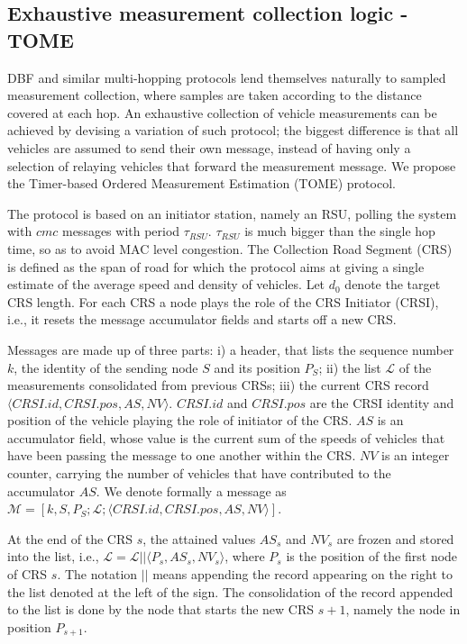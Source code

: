 \documentclass[conference]{IEEEtran}
\begin{document}
\subsection{Exhaustive measurement collection logic - TOME}
\label{subsec:DBFexh}
DBF and similar multi-hopping protocols lend themselves naturally to sampled measurement collection, where samples are taken according to the distance covered at each hop. An exhaustive collection of vehicle measurements can be achieved by devising a variation of such protocol; the biggest difference is that all vehicles are assumed to send their own message, instead of having only a selection of relaying vehicles that forward the measurement message. We propose the Timer-based Ordered Measurement Estimation (TOME) protocol.


The protocol is based on an initiator station, namely an RSU, polling the system with $cmc$ messages with period $\tau_{RSU}$. $\tau_{RSU}$ is much bigger than the single hop time, so as to avoid MAC level congestion. The Collection Road Segment (CRS) is defined as the span of road for which the protocol aims at giving a single estimate of the average speed and density of vehicles. Let $d_0$ denote the target CRS length. For each CRS a node plays the role of the CRS Initiator (CRSI), i.e., it resets the message accumulator fields and starts off a new CRS.

Messages are made up of three parts: i) a header, that lists the sequence number $k$, the identity of the sending node $S$ and its position $P_S$; ii) the list $\mathcal{L}$ of the measurements consolidated from previous CRSs; iii) the current CRS record $\langle CRSI.id,CRSI.pos,AS,NV \rangle$. $CRSI.id$ and $CRSI.pos$ are the CRSI identity and position of the vehicle playing the role of initiator of the CRS. $AS$ is an accumulator field, whose value is the current sum of the speeds of vehicles that have been passing the message to one another within the CRS. $NV$ is an integer counter, carrying the number of vehicles that have contributed to the accumulator $AS$. We denote formally a message as $\mathcal{M}=[k,S,P_S;\mathcal{L};\langle CRSI.id,CRSI.pos,AS,NV \rangle]$.

At the end of the CRS $s$, the attained values $AS_s$ and $NV_s$ are frozen and stored into the list, i.e., $\mathcal{L}=\mathcal{L} || \langle P_{s}, AS_s,NV_s \rangle$, where $P_{s}$ is the position of the first node of CRS $s$. The notation $||$ means appending the record appearing on the right to the list denoted at the left of the sign. The consolidation of the record appended to the list is done by the node that starts the new CRS $s+1$, namely the node in position $P_{s+1}$.
\end{document}
